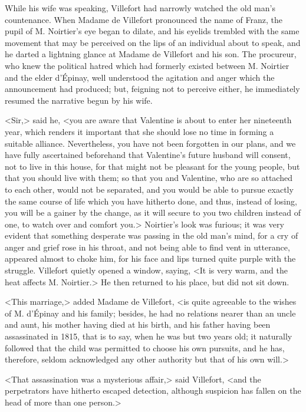  While his wife was speaking, Villefort had narrowly watched the old man's countenance. When Madame de Villefort pronounced the name of Franz, the pupil of M. Noirtier's eye began to dilate, and his eyelids trembled with the same movement that may be perceived on the lips of an individual about to speak, and he darted a lightning glance at Madame de Villefort and his son. The procureur, who knew the political hatred which had formerly existed between M. Noirtier and the elder d'Épinay, well understood the agitation and anger which the announcement had produced; but, feigning not to perceive either, he immediately resumed the narrative begun by his wife. 

 <Sir,> said he, <you are aware that Valentine is about to enter her nineteenth year, which renders it important that she should lose no time in forming a suitable alliance. Nevertheless, you have not been forgotten in our plans, and we have fully ascertained beforehand that Valentine's future husband will consent, not to live in this house, for that might not be pleasant for the young people, but that you should live with them; so that you and Valentine, who are so attached to each other, would not be separated, and you would be able to pursue exactly the same course of life which you have hitherto done, and thus, instead of losing, you will be a gainer by the change, as it will secure to you two children instead of one, to watch over and comfort you.>  Noirtier's look was furious; it was very evident that something desperate was passing in the old man's mind, for a cry of anger and grief rose in his throat, and not being able to find vent in utterance, appeared almost to choke him, for his face and lips turned quite purple with the struggle. Villefort quietly opened a window, saying, <It is very warm, and the heat affects M. Noirtier.> He then returned to his place, but did not sit down. 

 <This marriage,> added Madame de Villefort, <is quite agreeable to the wishes of M. d'Épinay and his family; besides, he had no relations nearer than an uncle and aunt, his mother having died at his birth, and his father having been assassinated in 1815, that is to say, when he was but two years old; it naturally followed that the child was permitted to choose his own pursuits, and he has, therefore, seldom acknowledged any other authority but that of his own will.> 

 <That assassination was a mysterious affair,> said Villefort, <and the perpetrators have hitherto escaped detection, although suspicion has fallen on the head of more than one person.> 

